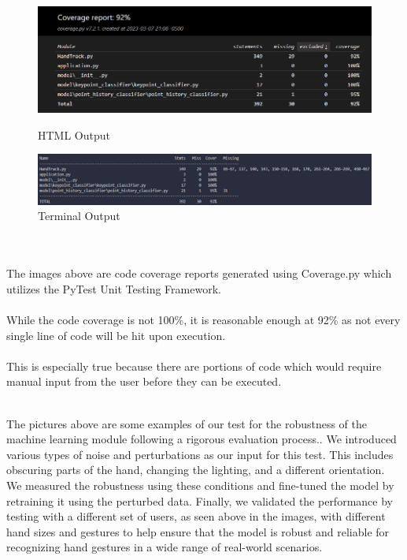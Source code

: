 \documentclass[12pt, titlepage]{article}
\begin{document}
\begin{figure}[h]
    \includegraphics[width=\linewidth]{coverage_report_html.png}
    \caption{HTML Output}\label{fig:Coverage Report - HTML}
  \endminipage\hfill
    \includegraphics[width=\linewidth]{coverage_report_terminal.png}
    \caption{Terminal Output}\label{fig:Coverage Report - Terminal}
  \endminipage\hfill
\end{figure}\\
~\\
The images above are code coverage reports generated using Coverage.py which utilizes the PyTest Unit Testing Framework. \\
~\\
While the code coverage is not 100\%, it is reasonable enough at 92\% as not every single line of code will be hit upon execution. \\
~\\
This is especially true because there are portions of code which would require manual input from the user before they can be executed.




~\\
The pictures above are some examples of our test for the robustness of the machine learning module following a 
rigorous evaluation process.. We introduced various types of noise and perturbations as our input for this test.
 This includes obscuring parts of the hand, changing the lighting, and a different orientation. We measured 
 the robustness using these conditions and fine-tuned the model by retraining it using the perturbed data. 
 Finally, we validated the performance by testing with a different set of users, as seen above in the images,
  with different hand sizes and gestures to help ensure that the model is robust and reliable for recognizing 
  hand gestures in a wide range of real-world scenarios.
\end{document}
